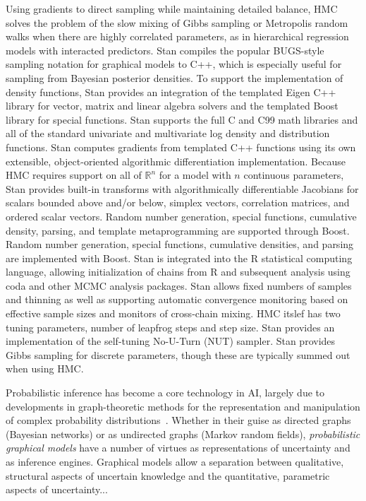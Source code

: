 \documentclass[twoside,11pt]{article}
\begin{document}
Using gradients to direct sampling while maintaining detailed balance,
HMC solves the problem of the slow mixing of Gibbs sampling or
Metropolis random walks when there are highly correlated parameters,
as in hierarchical regression models with interacted predictors. Stan
compiles the popular BUGS-style sampling notation for graphical models
to C++, which is especially useful for sampling from Bayesian
posterior densities. To support the implementation of density
functions, Stan provides an integration of the templated Eigen C++
library for vector, matrix and linear algebra solvers and the
templated Boost library for special functions. Stan supports the full
C and C99 math libraries and all of the standard univariate and
multivariate log density and distribution functions. Stan computes
gradients from templated C++ functions using its own extensible,
object-oriented algorithmic differentiation implementation. Because
HMC requires support on all of ${\mathbb R}^n$ for a model with $n$
continuous parameters, Stan provides built-in transforms with
algorithmically differentiable Jacobians for scalars bounded above
and/or below, simplex vectors, correlation matrices, and ordered
scalar vectors. Random number generation, special functions,
cumulative density, parsing, and template metaprogramming are
supported through Boost. Random number generation, special functions,
cumulative densities, and parsing are implemented with Boost. Stan is
integrated into the R statistical computing language, allowing
initialization of chains from R and subsequent analysis using coda and
other MCMC analysis packages. Stan allows fixed numbers of samples and
thinning as well as supporting automatic convergence monitoring based
on effective sample sizes and monitors of cross-chain mixing. HMC
itslef has two tuning parameters, number of leapfrog steps and step
size. Stan provides an implementation of the self-tuning No-U-Turn
(NUT) sampler. Stan provides Gibbs sampling for discrete parameters,
though these are typically summed out when using HMC.

Probabilistic inference has become a core technology in AI,
largely due to developments in graph-theoretic methods for the 
representation and manipulation of complex probability 
distributions~\citep{pearl:88}.  Whether in their guise as 
directed graphs (Bayesian networks) or as undirected graphs (Markov 
random fields), \emph{probabilistic graphical models} have a number 
of virtues as representations of uncertainty and as inference engines.  
Graphical models allow a separation between qualitative, structural
aspects of uncertain knowledge and the quantitative, parametric aspects 
of uncertainty...\\
\end{document}
